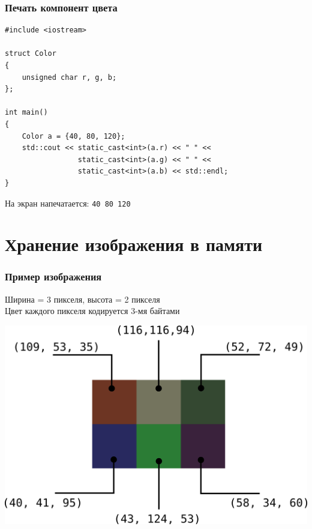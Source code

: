 \documentclass[10pt,pdf,hyperref={unicode}]{beamer}
\begin{document}
\begin{frame}[fragile]
\frametitle{Печать компонент цвета}
\begin{lstlisting}
#include <iostream>

struct Color 
{
    unsigned char r, g, b;
};

int main()
{
    Color a = {40, 80, 120};
    std::cout << static_cast<int>(a.r) << " " << 
                 static_cast<int>(a.g) << " " << 
                 static_cast<int>(a.b) << std::endl;
}
\end{lstlisting}
На экран напечатается: \texttt{40 80 120}
\end{frame}

\section{Хранение изображения в памяти}

\begin{frame}[fragile]
\frametitle{Пример изображения}
Ширина = 3 пикселя, высота = 2 пикселя\\
Цвет каждого пикселя кодируется 3-мя байтами\\
\begin{center}
\includegraphics[scale=0.65]{./images/tiny_new_wn.png}
\end{center}
\end{frame}
\end{document}
